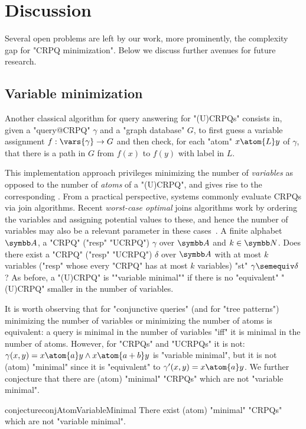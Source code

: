 \section{Discussion}
\label{sec:discussion-min}

Several open problems are left by our work, more prominently, the complexity gap for "CRPQ minimization". Below we discuss further avenues for future research.

\subsection{Variable minimization}
\label{sec:varmin}

Another classical algorithm for query answering for "(U)CRPQs" consists in, given a "query@CRPQ" $\gamma$ and a "graph database" $G$, to first guess a variable assignment $f: \vars{\gamma} \to G$ and then check, for each "atom" $x \atom{L} y$ of $\gamma$, that there is a path in $G$ from $f(x)$ to $f(y)$ with label in $L$. 

This implementation approach privileges minimizing the number of \emph{variables} as opposed to the number of \emph{atoms} of a "(U)CRPQ", and gives rise to the corresponding . From a practical perspective, systems commonly evaluate CRPQs via join algorithms. Recent \emph{worst-case optimal} joins algorithms work by ordering the variables and assigning potential values to these, and hence the number of variables may also be a relevant parameter in these cases~\cite{CucumidesReutterVrgoc2024SizeBounds,VrgocEtal2024MillenniumDB}. 
{A finite alphabet $\A$, a  "CRPQ" ("resp" "UCRPQ") $\gamma$ over $\A$ and $k \in \N$.}
{Does there exist a "CRPQ" ("resp" "UCRPQ") $\delta$ over $\A$ with at most $k$ variables 
("resp" whose every "CRPQ" has at most $k$ variables) "st" $\gamma \semequiv \delta$?}
As before, a "(U)CRPQ" is \AP""variable minimal"" if there is no "equivalent" "(U)CRPQ" smaller in the number of variables.

It is worth observing that for "conjunctive queries" (and for "tree patterns") minimizing the number of variables or minimizing the number of atoms is equivalent: a query is minimal in the number of variables "iff" it is minimal in the number of atoms.
However, for "CRPQs" and "UCRPQs" it is not: $\gamma(x,y) = x \atom{a} y \land x \atom{a+b} y$ is "variable minimal", but it is not (atom) "minimal" since it is "equivalent" to $\gamma'(x,y) = x \atom{a} y$. We further conjecture that there are (atom) "minimal" "CRPQs" which are not "variable minimal".
\begin{restatable}{conjecture}{conjAtomVariableMinimal}
  There exist (atom) "minimal" "CRPQs" which are not "variable minimal".
\end{restatable}

